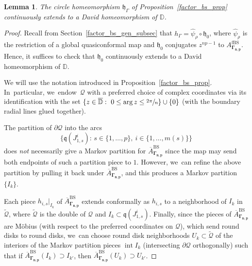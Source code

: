 \documentclass[10pt,a4paper]{amsart}
\newtheorem{lemma}{Lemma}[section]
\theoremstyle{definition}
\theoremstyle{remark}
\newcommand{\D}{\mathbb{D}}
\DeclareMathOperator{\Int}{int}
\begin{document}
\begin{lemma}\label{david_ext_lem}
The circle homeomorphism $\mathfrak{h}_\Gamma$ of Proposition~\ref{factor_bs_prop} continuously extends to a David homeomorphism of $\D$.
\end{lemma}
\begin{proof}
Recall from Section~\ref{factor_bs_gen_subsec} that $h_\Gamma=\widehat{\psi}_\rho\circ\mathfrak{h}_0$, where $\widehat{\psi}_\rho$ is the restriction of a global quasiconformal map and $\mathfrak{h}_0$ conjugates $z^{np-1}$ to $A_{\pmb{\Gamma_{n,p}}}^{\mathrm{fBS}}$. Hence, it suffices to check that $\mathfrak{h}_0$ continuously extends to a David homeomorphism of $\D$.

We will use the notation introduced in Proposition~\ref{factor_bs_prop}. In~particular, we~endow~$\mathcal{\mathcal{Q}}$ with a preferred choice of complex coordinates via its identification with the set \hbox{$\{z\in\overline{\D}:\ 0\leq\arg{z}\leq\sfrac{2\pi}{n}\}\cup\{0\}$} (with the boundary radial lines glued together).

The partition of $\partial\mathcal{Q}$ into the arcs
\[
\bigl\{\mathfrak{q}(J_{1,s}^i): \, s\in\{1,\dots,p\},\ i\in\{1,\dots,m(s)\}\bigr\}
\]
does \emph{not} necessarily give a Markov partition for $\overline{A}_{\pmb{\Gamma_{n,p}}}^{\mathrm{BS}}$ since the map may send both endpoints of such a partition piece to $1$. However, we~can refine the above partition by pulling it back under $\overline{A}_{\pmb{\Gamma_{n,p}}}^{\mathrm{BS}}$, and this produces a Markov partition~$\{I_k\}$.

Each piece $h_{i,s}\vert_{I_k}$ of $\overline{A}_{\pmb{\Gamma_{n,p}}}^{\mathrm{BS}}$ extends conformally as $h_{i,s}$ to a neighborhood of $I_k$ in~$\widetilde{\mathcal{Q}}$, where $\widetilde{\mathcal{Q}}$ is the double of $\mathcal{Q}$ and $I_k\subset \mathfrak{q}(J_{1,s}^i)$.
Finally, since the pieces of $\overline{A}_{\pmb{\Gamma_{n,p}}}^{\mathrm{BS}}$ are Möbius (with respect to the preferred coordinates on $\mathcal{Q}$), which send round disks to round disks, we~can choose round disk neighborhoods $U_k\subset \widetilde{\mathcal{Q}}$ of the interiors of the Markov partition pieces $\Int{I_k}$ (intersecting $\partial\mathcal{Q}$ orthogonally) such that if \hbox{$\overline{A}_{\pmb{\Gamma_{n,p}}}^{\mathrm{BS}}(I_k)\supset I_{k'}$}, then $\overline{A}_{\pmb{\Gamma_{n,p}}}^{\mathrm{BS}}(U_k)\supset U_{k'}$.


\end{proof}
\end{document}
